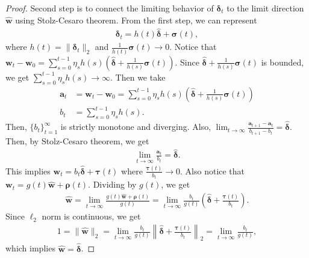\documentclass{article} %
\theoremstyle{plain}
\theoremstyle{definition}
\theoremstyle{remark}
\def\bignorm#1{\left\lVert#1\right\rVert}
\def\bigopen#1{\left(#1\right)}
\def\ba{{\boldsymbol a}}
\def\bdel{{\boldsymbol \delta}}
\def\bw{{\mathbf w}}
\begin{document}
\begin{proof}
    Second step is to connect the limiting behavior of $\bdel_t$ to the limit direction $\hat{\bw}$ using Stolz-Cesaro theorem. From the first step, we can represent
    \begin{align*}
        \bdel_t = h(t)\hat\bdel + \boldsymbol{\sigma}(t),
    \end{align*}
    where $h(t) = \|\bdel_t\|_2$ and $\frac{1}{h(t)}\boldsymbol{\sigma}(t) \rightarrow 0$. Notice that $\bw_t - \bw_0=\sum_{s=0}^{t-1}\eta_sh(s)(\hat{\bdel}+\frac{1}{h(s)}\boldsymbol{\sigma}(t))$. Since $\hat{\bdel}+\frac{1}{h(s)}\boldsymbol{\sigma}(t)$ is bounded, we get $\sum_{s=0}^{t-1}\eta_sh(s) \rightarrow \infty$. Then we take
    \begin{align*}
        \ba_t &= \bw_t-\bw_0=\sum_{s=0}^{t-1}\eta_sh(s)(\hat{\bdel}+\frac{1}{h(s)}\boldsymbol{\sigma}(t)) \\
        b_t&=\sum_{s=0}^{t-1}\eta_sh(s).
    \end{align*}
    Then, $\{b_t\}_{t=1}^\infty$ is strictly monotone and diverging. Also, $\lim_{t \rightarrow \infty}\frac{\ba_{t+1}-\ba_t}{b_{t+1}-b_t}=\hat{\bdel}$. Then, by Stolz-Cesaro theorem, we get
    \begin{align*}
        \lim_{t\rightarrow \infty}\frac{\ba_t}{b_t}=\hat{\bdel}.
    \end{align*}
    This implies $\bw_t =  b_t \hat{\bdel} + \boldsymbol{\tau}(t)$ where $\frac{\boldsymbol{\tau}(t)}{b_t} \rightarrow 0$. Also notice that $\bw_t=g(t) \hat{\bw}+\boldsymbol{\rho}(t)$. Dividing by $g(t)$, we get 
    \begin{align*}
        \hat{\bw} = \lim_{t \rightarrow \infty} \frac{g(t) \hat{\bw} + \boldsymbol{\rho}(t)}{g(t)} = \lim_{t \rightarrow \infty} \frac{b_t}{g(t)}\bigopen{\hat{\bdel} + \frac{\boldsymbol{\tau}(t)}{b_t}}.
    \end{align*}
    Since $\ell_2$ norm is continuous, we get
    \begin{align*}
        1=\|\hat{\bw}\|_2=\lim_{t \rightarrow \infty} \frac{b_t}{g(t)} \bignorm{\hat{\bdel} + \frac{\boldsymbol{\tau}(t)}{b_t}}_2 = \lim_{t \rightarrow \infty} \frac{b_t}{g(t)},
    \end{align*}
    which implies $\hat{\bw} = \hat{\bdel}$.


\end{proof}
\end{document}
